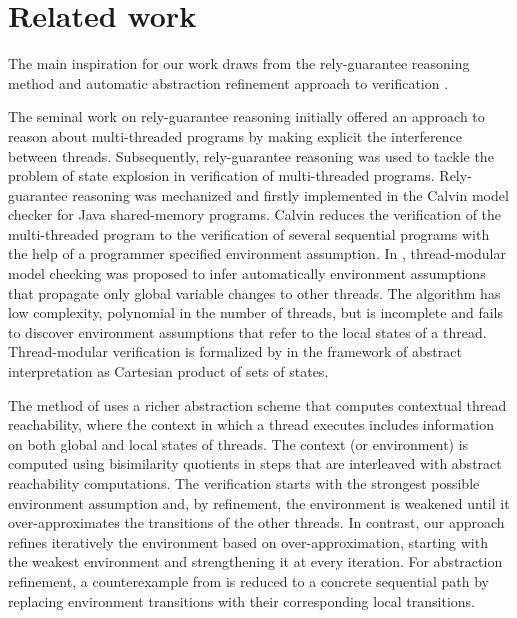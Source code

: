 \section{Related work}\label{sec-related}

The main inspiration for our work draws from the rely-guarantee
reasoning method \cite{JonesTOPLAS83, RelyGuarantee} and automatic
abstraction refinement approach to verification \cite{ClarkeCEGAR}.

The seminal work on rely-guarantee reasoning \cite{JonesTOPLAS83,
  RelyGuarantee} initially offered an approach to reason about
multi-threaded programs by making explicit the interference between
threads.
Subsequently, rely-guarantee reasoning was used to tackle the problem
of state explosion in verification of multi-threaded programs.
Rely-guarantee reasoning was mechanized and firstly implemented in the 
Calvin model checker \cite{CalvinESOP} for Java shared-memory programs.
Calvin reduces the verification of the multi-threaded program to the
verification of several sequential programs with the help of a
programmer specified environment assumption.
In \cite{ThreadModularFlanaganQadeer}, thread-modular model checking
was proposed to infer automatically environment assumptions that
propagate only global variable changes to other threads. 
The algorithm has low complexity, polynomial in the number of threads,
but is incomplete and fails to discover environment assumptions that
refer to the local states of a thread.
Thread-modular verification is formalized by \cite{MalkisICTAC06} in
the framework of abstract interpretation as Cartesian product of sets
of states. 


The method of \cite{HenzingerPLDI04} uses a richer abstraction scheme
that computes contextual thread reachability, where the context in
which a thread executes includes information on both global and local
states of threads.
The context (or environment) is computed using bisimilarity quotients
in steps that are interleaved with abstract reachability computations.
The verification starts with the strongest possible environment
assumption and, by refinement, the environment is weakened until
it over-approximates the transitions of the other threads.
In contrast, our approach refines iteratively the environment based on
over-approximation, starting with the weakest environment and
strengthening it at every iteration. 
For abstraction refinement, a counterexample from
\cite{HenzingerPLDI04} is reduced to a concrete sequential path by
replacing environment transitions with their corresponding local
transitions.

